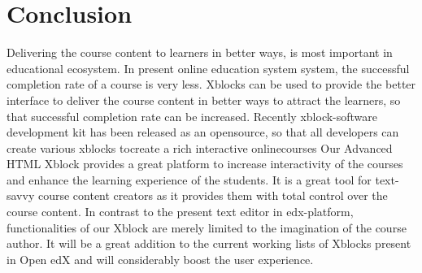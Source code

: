\chapter{Conclusion}
Delivering the course content to learners in better ways, is most important in educational ecosystem.
In present online education system system, the successful completion rate of a course is very less.
Xblocks can be used to provide the better interface to deliver the course content in better ways to
attract the learners, so that successful completion rate can be increased. Recently xblock-software
development kit has been released as an opensource, so that all developers can create various
xblocks tocreate a rich interactive onlinecourses
\newline
\newline
Our Advanced HTML Xblock provides a great platform to increase interactivity of the courses and
enhance the learning experience of the students. It is a great tool for text-savvy course content
creators as it provides them with total control over the course content. In contrast to the present text
editor in edx-platform, functionalities of our Xblock are merely limited to the imagination of the
course author. It will be a great addition to the current working lists of Xblocks present in Open edX
and will considerably boost the user experience.